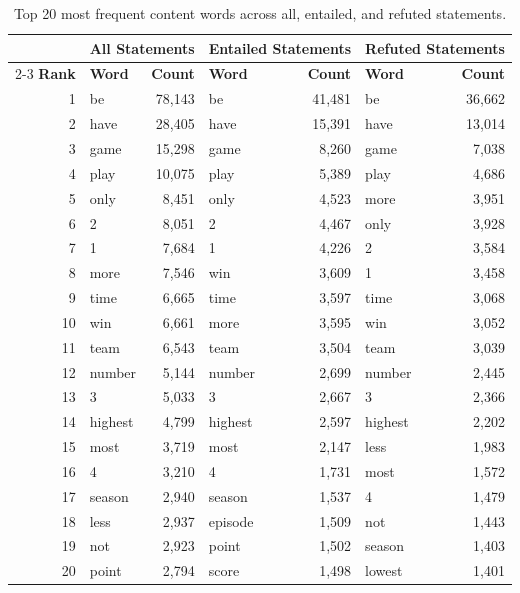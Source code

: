 \begin{table}[ht]
\centering
\small
\begin{tabular}{r l r l r l r}
\hline
 & \multicolumn{2}{c}{\textbf{All Statements}} & \multicolumn{2}{c}{\textbf{Entailed Statements}} & \multicolumn{2}{c}{\textbf{Refuted Statements}} \\
\cline{2-3} \cline{4-5} \cline{6-7}
\textbf{Rank} & \textbf{Word} & \textbf{Count} & \textbf{Word} & \textbf{Count} & \textbf{Word} & \textbf{Count} \\
\hline
1  & be      & 78,143 & be      & 41,481 & be      & 36,662 \\
2  & have    & 28,405 & have    & 15,391 & have    & 13,014 \\
3  & game    & 15,298 & game    & 8,260  & game    & 7,038  \\
4  & play    & 10,075 & play    & 5,389  & play    & 4,686  \\
5  & only    & 8,451  & only    & 4,523  & more    & 3,951  \\
6  & 2       & 8,051  & 2       & 4,467  & only    & 3,928  \\
7  & 1       & 7,684  & 1       & 4,226  & 2       & 3,584  \\
8  & more    & 7,546  & win     & 3,609  & 1       & 3,458  \\
9  & time    & 6,665  & time    & 3,597  & time    & 3,068  \\
10 & win     & 6,661  & more    & 3,595  & win     & 3,052  \\
11 & team    & 6,543  & team    & 3,504  & team    & 3,039  \\
12 & number  & 5,144  & number  & 2,699  & number  & 2,445  \\
13 & 3       & 5,033  & 3       & 2,667  & 3       & 2,366  \\
14 & highest & 4,799  & highest & 2,597  & highest & 2,202  \\
15 & most    & 3,719  & most    & 2,147  & less    & 1,983  \\
16 & 4       & 3,210  & 4       & 1,731  & most    & 1,572  \\
17 & season  & 2,940  & season  & 1,537  & 4       & 1,479  \\
18 & less    & 2,937  & episode & 1,509  & not     & 1,443  \\
19 & not     & 2,923  & point   & 1,502  & season  & 1,403  \\
20 & point   & 2,794  & score   & 1,498  & lowest  & 1,401  \\
\hline
\end{tabular}
\caption{Top 20 most frequent content words across all, entailed, and refuted statements.}
\label{tab:tabfact_top_20_content_words}
\end{table}